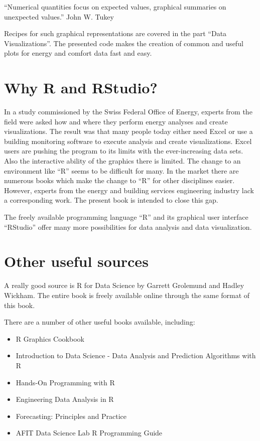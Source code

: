 \documentclass[
]{book}
\providecommand{\tightlist}{%
  \setlength{\itemsep}{0pt}\setlength{\parskip}{0pt}}
\begin{document}
``Numerical quantities focus on expected values, graphical summaries on unexpected values.''
John W. Tukey

Recipes for such graphical representations are covered in the part ``Data Visualizations''. The presented code makes the creation of common and useful plots for energy and comfort data fast and easy.

\hypertarget{why-r-and-rstudio}{%
\section{Why R and RStudio?}\label{why-r-and-rstudio}}

In a study commissioned by the Swiss Federal Office of Energy, experts from the field were asked how and where they perform energy analyses and create visualizations. The result was that many people today either need Excel or use a building monitoring software to execute analysis and create visualizations. Excel users are pushing the program to its limits with the ever-increasing data sets. Also the interactive ability of the graphics there is limited. The change to an environment like ``R'' seems to be difficult for many. In the market there are numerous books which make the change to ``R'' for other disciplines easier. However, experts from the energy and building services engineering industry lack a corresponding work. The present book is intended to close this gap.

The freely available programming language ``R'' and its graphical user interface ``RStudio'' offer many more possibilities for data analysis and data visualization.

\hypertarget{other-useful-sources}{%
\section{Other useful sources}\label{other-useful-sources}}

A really good source is R for Data Science by Garrett Grolemund and Hadley Wickham. The entire book is freely available online through the same format of this book.

There are a number of other useful books available, including:

\begin{itemize}
\tightlist
\item
  R Graphics Cookbook
\item
  Introduction to Data Science - Data Analysis and Prediction Algorithms with R
\item
  Hands-On Programming with R
\item
  Engineering Data Analysis in R
\item
  Forecasting: Principles and Practice
\item
  AFIT Data Science Lab R Programming Guide
\end{itemize}
\end{document}
